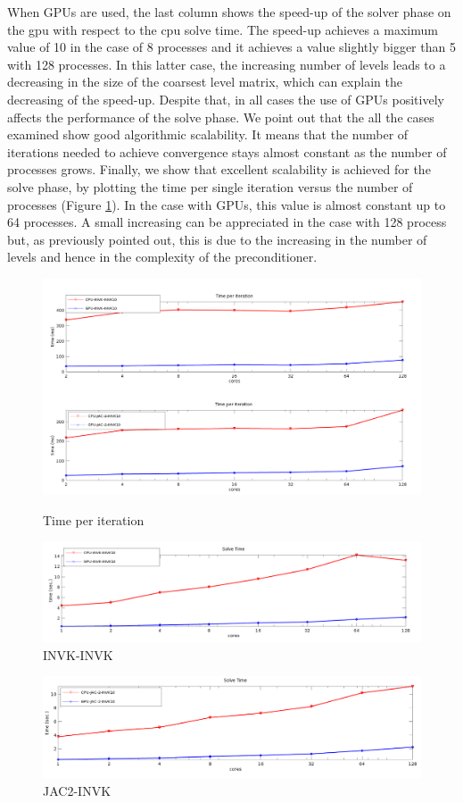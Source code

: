When GPUs are used, the last column shows the speed-up of the solver
phase on the gpu with respect to the cpu solve time. The speed-up
achieves a maximum value of 10 in the case of 8 processes and it
achieves a value slightly bigger than 5 with 128 processes. In this
latter case, the increasing number of levels leads to a decreasing in
the size of the coarsest level matrix, which can explain the
decreasing of the speed-up. Despite that, in all cases the use of GPUs
positively affects the performance of the solve phase.  
We point out that the all the cases examined show good algorithmic
scalability. It means that the number of iterations needed to achieve
convergence stays almost constant as the number of processes grows.  
Finally, we show that excellent scalability is achieved for the solve
phase, by plotting the time per single iteration versus the number of
processes (Figure \ref{fig:time_per_it}). In the case with GPUs, this
value is almost constant up to 64 processes. A small increasing can be
appreciated in the case with 128 process but, as previously pointed
out, this is due to the increasing in the number of levels and hence
in the complexity of the preconditioner.      

\begin{figure}[h!]
\caption{Time per iteration}
\centering
\includegraphics[width=1\textwidth]{time_per_it.png}
\label{fig:time_per_it}
\end{figure}


\begin{figure}
\begin{center}
\includegraphics[width=.9\textwidth]{graf_invk.png}
\end{center}
\caption{INVK-INVK}
\end{figure}

\begin{figure}
\begin{center}
\includegraphics[width=.9\textwidth]{graf_jac2.png}
\end{center}
\caption{JAC2-INVK}
\end{figure}
